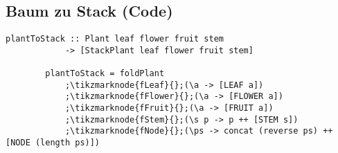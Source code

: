 \documentclass[
	aspectratio=169, 
	10pt 
]{beamer}
\begin{document}
\subsection{Baum zu Stack (Code)}
\begin{frame}[t, fragile]{\insertsubsection}
    \begin{lstlisting}[gobble=8]
        plantToStack :: Plant leaf flower fruit stem 
            -> [StackPlant leaf flower fruit stem]
        
        plantToStack = foldPlant
            ;\tikzmarknode{fLeaf}{};(\a -> [LEAF a])
            ;\tikzmarknode{fFlower}{};(\a -> [FLOWER a])
            ;\tikzmarknode{fFruit}{};(\a -> [FRUIT a])
            ;\tikzmarknode{fStem}{};(\s p -> p ++ [STEM s])
            ;\tikzmarknode{fNode}{};(\ps -> concat (reverse ps) ++ [NODE (length ps)])
    \end{lstlisting}

\end{frame}
\end{document}
